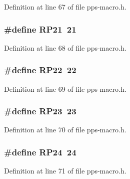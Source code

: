 Definition at line 67 of file pps-\/macro.\+h.

\hypertarget{pps-macro_8h_ad79c8cd8492fb9c6b086511fd3004dd1}{}
\subsubsection[{R\+P21}]{\setlength{\rightskip}{0pt plus 5cm}\#define R\+P21~21}\label{pps-macro_8h_ad79c8cd8492fb9c6b086511fd3004dd1}


Definition at line 68 of file pps-\/macro.\+h.

\hypertarget{pps-macro_8h_a4ccfe2eae837590fab0ad9ea2e673346}{}
\subsubsection[{R\+P22}]{\setlength{\rightskip}{0pt plus 5cm}\#define R\+P22~22}\label{pps-macro_8h_a4ccfe2eae837590fab0ad9ea2e673346}


Definition at line 69 of file pps-\/macro.\+h.

\hypertarget{pps-macro_8h_abdd98cd188c710d9cd824c2d1d5a6864}{}
\subsubsection[{R\+P23}]{\setlength{\rightskip}{0pt plus 5cm}\#define R\+P23~23}\label{pps-macro_8h_abdd98cd188c710d9cd824c2d1d5a6864}


Definition at line 70 of file pps-\/macro.\+h.

\hypertarget{pps-macro_8h_ad73367e456f2c5af84735f8b29e7f601}{}
\subsubsection[{R\+P24}]{\setlength{\rightskip}{0pt plus 5cm}\#define R\+P24~24}\label{pps-macro_8h_ad73367e456f2c5af84735f8b29e7f601}


Definition at line 71 of file pps-\/macro.\+h.

\hypertarget{pps-macro_8h_a987c8aaf43771fcf5d1fbce4fef5837f}{}
